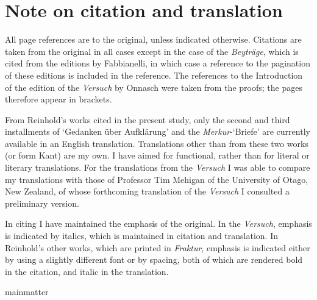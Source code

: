 
\chapter{Note on citation and translation}


All page references are to the original, unless indicated otherwise. Citations are taken from the original in all cases except in the case of the \textit{Beytr\"{a}ge}, which is cited from the editions by Fabbianelli, in which case a reference to the pagination of these editions is included in the reference. The references to the Introduction of the edition of the \textit{Versuch} by Onnasch were taken from the proofs; the pages therefore appear in brackets.

 From Reinhold's works cited in the present study, only the second and third installments of `Gedanken \"{u}ber Aufkl\"{a}rung' and the \textit{Merkur}{-}`Briefe' are currently available in an English translation. Translations other than from these two works (or form Kant) are my own. I have aimed for functional, rather than for literal or literary translations. For the translations from the \textit{Versuch} I was able to compare my translations with those of Professor Tim Mehigan of the University of Otago, New Zealand, of whose forthcoming translation of the \textit{Versuch} I consulted a preliminary version. 

 In citing I have maintained the emphasis of the original. In the \textit{Versuch}, emphasis is indicated by italics, which is maintained in citation and translation. In Reinhold's other works, which are printed in \textit{Fraktur}, emphasis is indicated either by using a slightly different font or by spacing, both of which are rendered bold in the citation, and italic in the translation. 

mainmatter

